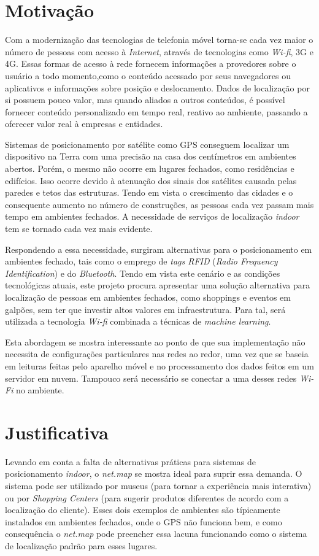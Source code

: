 \section{Motivação}\label{sec:motivation}
Com a modernização das tecnologias de telefonia móvel torna-se cada vez maior o
número de pessoas com acesso à \textit{Internet}, através de tecnologias como \textit{Wi-fi},
3G e 4G. Essas formas de acesso à rede fornecem informações a provedores sobre o
usuário a todo momento,como o conteúdo acessado por seus navegadores ou aplicativos
e informações sobre posição e deslocamento. Dados de localização por si possuem
pouco valor, mas quando aliados a outros conteúdos, é possível fornecer conteúdo
personalizado em tempo real, reativo ao ambiente, passando a oferecer valor real
à empresas e entidades.
\par
Sistemas de posicionamento por satélite como GPS conseguem localizar um dispositivo
na Terra com uma precisão na casa dos centímetros em ambientes abertos. Porém,
o mesmo não ocorre em lugares fechados, como residências e edifícios. Isso ocorre
devido à atenuação dos sinais dos satélites causada pelas paredes e tetos das
estruturas. Tendo em vista o crescimento das cidades e o consequente aumento no
número de construções, as pessoas cada vez passam mais tempo em ambientes
fechados. A necessidade de serviços de localização \textit{indoor} tem se tornado cada
vez mais evidente.
\par
Respondendo a essa necessidade, surgiram alternativas para o posicionamento em
ambientes fechado, tais como o emprego de \textit{tags RFID} (\textit{Radio Frequency Identification}) e do \textit{Bluetooth}. Tendo em vista este
cenário e as condições tecnológicas atuais, este projeto procura apresentar uma
solução alternativa para localização de pessoas em ambientes fechados, como shoppings e
eventos em galpões, sem ter que investir altos valores em infraestrutura. Para tal, será utilizada a tecnologia \textit{Wi-fi} combinada a técnicas de \textit{machine learning}.
\par
Esta abordagem se mostra interessante ao ponto de que sua implementação não
necessita de configurações particulares nas redes ao redor, uma vez que se baseia
em leituras feitas pelo aparelho móvel e no processamento dos dados feitos em um
servidor em nuvem. Tampouco será necessário se conectar a uma desses redes
\textit{Wi-Fi} no ambiente.

\section{Justificativa}\label{sec:justify}
Levando em conta a falta de alternativas práticas para sistemas de posicionamento \textit{indoor}, o \textit{net.map} se mostra ideal para suprir essa demanda. O sistema pode ser utilizado por museus (para tornar a experiência mais interativa) ou por \textit{Shopping Centers}  (para sugerir produtos diferentes de acordo com a localização do cliente). Esses dois exemplos de ambientes são típicamente instalados em ambientes fechados, onde o GPS não funciona bem, e como consequência o \textit{net.map} pode preencher essa lacuna funcionando como o sistema de localização padrão para esses lugares.